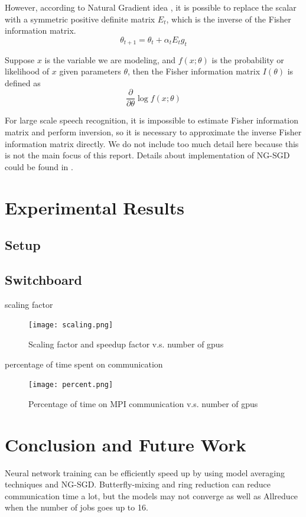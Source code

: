 \documentclass{article}
\begin{document}
However, according to Natural Gradient idea \cite{murata1999statistical,roux2008topmoumoute}, it is possible to replace 
the scalar with a symmetric positive definite matrix $E_t$, which is the inverse of the Fisher information matrix.
\begin{equation}
\theta_{t+1} = \theta_{t} + \alpha_t E_t g_t
\end{equation}

Suppose $x$ is the variable we are modeling, and $f(x;\theta)$ is the probability or likelihood of $x$ given parameters $\theta$, then the
Fisher information matrix $I(\theta)$ is defined as
\begin{equation}
\frac{\partial}{\partial\theta}\log f(x;\theta)
\end{equation}

For large scale speech recognition, it is impossible to estimate Fisher information matrix and perform inversion, 
so it is necessary to approximate the inverse Fisher information matrix directly. We do not include too much 
detail here because this is not the main focus of this report. Details about implementation of NG-SGD could 
be found in \cite{povey2014parallel}.


\section{Experimental Results}
\subsection{Setup}

\subsection{Switchboard}

scaling factor
\begin{figure}[htb]
  \centering
  \texttt{[image: scaling.png]}
  \caption{Scaling factor and speedup factor v.s. number of gpus}
  \label{fig:scaling}
\end{figure}

percentage of time spent on communication
\begin{figure}[htb]
  \centering
  \texttt{[image: percent.png]}
  \caption{Percentage of time on MPI communication v.s. number of gpus}
  \label{fig:percent}
\end{figure}


\section{Conclusion and Future Work}
Neural network training can be efficiently speed up by using model averaging techniques and NG-SGD. 
Butterfly-mixing and ring reduction can reduce communication time a lot, but the models may not converge as well as 
Allreduce when the number of jobs goes up to 16.
\end{document}
